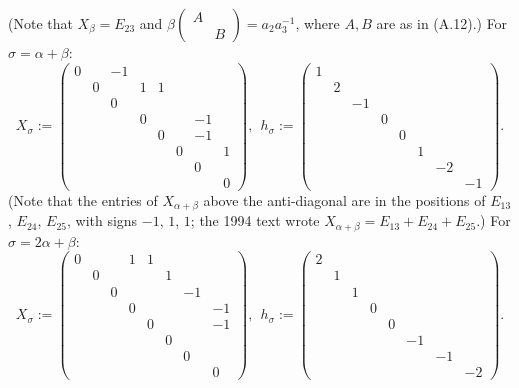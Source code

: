 \documentclass[12pt,letterpaper]{amsart}
\theoremstyle{plain}
\theoremstyle{definition}
\theoremstyle{remark}
\theoremstyle{definition}
\begin{document}
(Note that $X_{\beta} = E_{23}$ and
$\beta\begin{pmatrix} A& \\ &B\end{pmatrix} =a_2a_3^{-1}$, where $A,B$ are as
in (A.12).) For $\sigma = \alpha+\beta$:
\[
X_{\sigma} :=
\begin{pmatrix} 0& &-1& & & & & \\
          &0& &1&1& & & \\
          & &0& & & & & \\
          & & &0& & &-1& \\
          & & & &0& &-1& \\
          & & & & &0& &1\\
          & & & & & &0& \\
          & & & & & & &0
         \end{pmatrix},\ \
h_{\sigma} := \begin{pmatrix} 1& & & & & & & \\
                          &2& & & & & & \\
                          & &-1& & & & & \\
                          & & &0& & & & \\
                          & & & &0& & & \\
                          & & & & &1& & \\
                          & & & & & &-2& \\
                          & & & & & & &-1
                         \end{pmatrix}.
\]
(Note that the entries of $X_{\alpha+\beta}$ above the anti-diagonal are in the
positions of $E_{13}$, $E_{24}$, $E_{25}$, with signs $-1$, $1$, $1$; the 1994 text
wrote $X_{\alpha+\beta} = E_{13}+E_{24}+E_{25}$.) For
$\sigma = 2\alpha+\beta$:
\[
X_{\sigma} :=
\begin{pmatrix} 0& & &1&1& & & \\
          &0& & & &1& & \\
          & &0& & & &-1& \\
          & & &0& & & &-1\\
          & & & &0& & &-1\\
          & & & & &0& & \\
          & & & & & &0& \\
          & & & & & & &0
         \end{pmatrix},\ \
h_{\sigma} := \begin{pmatrix} 2& & & & & & & \\
                          &1& & & & & & \\
                          & &1& & & & & \\
                          & & &0& & & & \\
                          & & & &0& & & \\
                          & & & & &-1& & \\
                          & & & & & &-1& \\
                          & & & & & & &-2
                         \end{pmatrix}.
\]
\end{document}
